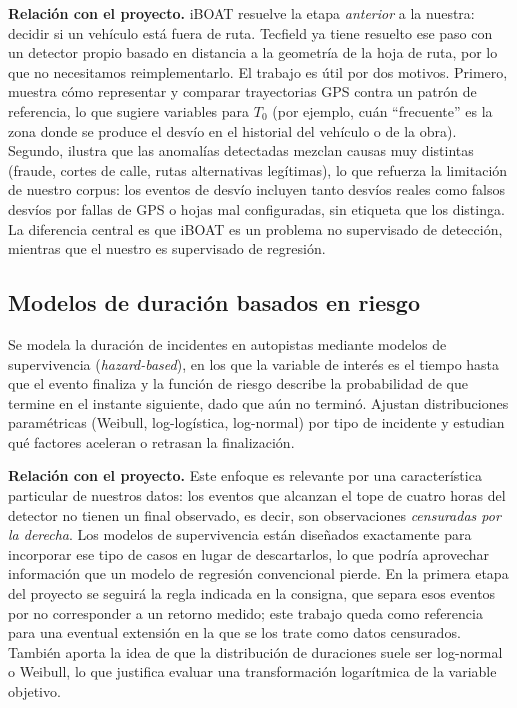 \documentclass[12pt, a4paper]{article}
\begin{document}
\textbf{Relación con el proyecto.} iBOAT resuelve la etapa \emph{anterior} a
la nuestra: decidir si un vehículo está fuera de ruta. Tecfield ya tiene
resuelto ese paso con un detector propio basado en distancia a la geometría de
la hoja de ruta, por lo que no necesitamos reimplementarlo. El trabajo es útil
por dos motivos. Primero, muestra cómo representar y comparar trayectorias GPS
contra un patrón de referencia, lo que sugiere variables para $T_0$ (por
ejemplo, cuán ``frecuente'' es la zona donde se produce el desvío en el
historial del vehículo o de la obra). Segundo, ilustra que las anomalías
detectadas mezclan causas muy distintas (fraude, cortes de calle, rutas
alternativas legítimas), lo que refuerza la limitación de nuestro corpus:
los eventos de desvío incluyen tanto desvíos reales como falsos desvíos por
fallas de GPS o hojas mal configuradas, sin etiqueta que los distinga. La
diferencia central es que iBOAT es un problema no supervisado de detección,
mientras que el nuestro es supervisado de regresión.

\subsection{Modelos de duración basados en riesgo
  \cite{hojati2013}}

Se modela la duración de incidentes en
autopistas mediante modelos de supervivencia (\emph{hazard-based}), en los que
la variable de interés es el tiempo hasta que el evento finaliza y la función
de riesgo describe la probabilidad de que termine en el instante siguiente,
dado que aún no terminó. Ajustan distribuciones paramétricas (Weibull,
log-logística, log-normal) por tipo de incidente y estudian qué factores
aceleran o retrasan la finalización.

\textbf{Relación con el proyecto.} Este enfoque es relevante por una
característica particular de nuestros datos: los eventos que alcanzan el tope
de cuatro horas del detector no tienen un final observado, es decir, son
observaciones \emph{censuradas por la derecha}. Los modelos de supervivencia
están diseñados exactamente para incorporar ese tipo de casos en lugar de
descartarlos, lo que podría aprovechar información que un modelo de regresión
convencional pierde. En la primera etapa del proyecto se seguirá la regla
indicada en la consigna, que separa esos eventos por no corresponder a un
retorno medido; este trabajo queda como
referencia para una eventual extensión en la que se los trate como datos
censurados. También aporta la idea de que la distribución de duraciones suele
ser log-normal o Weibull, lo que justifica evaluar una transformación
logarítmica de la variable objetivo.
\end{document}
